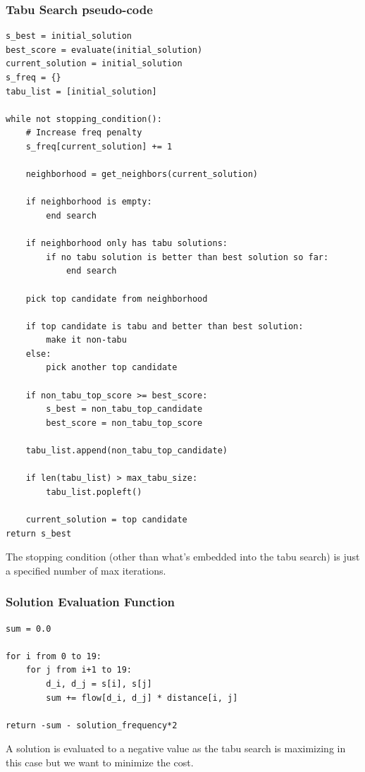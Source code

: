\documentclass{article}
\begin{document}
\subsubsection{Tabu Search pseudo-code}

\begin{lstlisting}
s_best = initial_solution
best_score = evaluate(initial_solution)
current_solution = initial_solution
s_freq = {}
tabu_list = [initial_solution]

while not stopping_condition():
    # Increase freq penalty
    s_freq[current_solution] += 1

    neighborhood = get_neighbors(current_solution)

    if neighborhood is empty:
        end search

    if neighborhood only has tabu solutions:
        if no tabu solution is better than best solution so far:
            end search

    pick top candidate from neighborhood

    if top candidate is tabu and better than best solution:
        make it non-tabu
    else:
        pick another top candidate

    if non_tabu_top_score >= best_score:
        s_best = non_tabu_top_candidate
        best_score = non_tabu_top_score

    tabu_list.append(non_tabu_top_candidate)

    if len(tabu_list) > max_tabu_size:
        tabu_list.popleft()

    current_solution = top candidate
return s_best
\end{lstlisting}

The stopping condition (other than what's embedded into the tabu search) is just a specified number of max iterations.

\subsubsection{Solution Evaluation Function}
\begin{lstlisting}
sum = 0.0

for i from 0 to 19:
    for j from i+1 to 19:
        d_i, d_j = s[i], s[j]
        sum += flow[d_i, d_j] * distance[i, j]
        
return -sum - solution_frequency*2
\end{lstlisting}

A solution is evaluated to a negative value as the tabu search is maximizing in this case but we want to minimize the cost.
\end{document}

